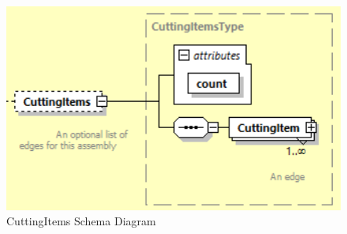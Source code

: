 \begin{figure}[ht]
  \centering
    \includegraphics[width=1.0\textwidth]{figures/CuttingItems Schema.png}
  \caption{CuttingItems Schema Diagram}
  \label{fig:CuttingItems Schema Diagram}
\end{figure}

\FloatBarrier


